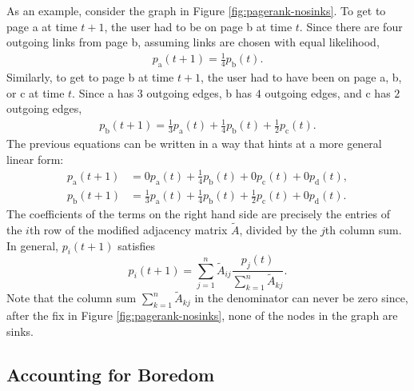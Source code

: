 As an example, consider the graph in Figure \ref{fig:pagerank-nosinks}.
To get to page a at time $t + 1$, the user had to be on page b at time $t$.
Since there are four outgoing links from page b, assuming links are chosen with equal likelihood,
\begin{align*}
p_\text{a}(t+1) = \frac{1}{4}p_\text{b}(t).
\end{align*}
Similarly, to get to page b at time $t+1$, the user had to have been on page a, b, or c at time $t$.
Since a has $3$ outgoing edges, b has $4$ outgoing edges, and c has $2$ outgoing edges,
\begin{align*}
p_\text{b}(t+1)
= \frac{1}{3}p_\text{a}(t)
+ \frac{1}{4}p_\text{b}(t)
+ \frac{1}{2}p_\text{c}(t).
\end{align*}
The previous equations can be written in a way that hints at a more general linear form:
\begin{align*}
p_\text{a}(t+1)
    &= 0p_\text{a}(t)
    + \frac{1}{4}p_\text{b}(t)
    + 0p_\text{c}(t)
    + 0p_\text{d}(t),
\\
p_\text{b}(t+1)
    &= \frac{1}{3}p_\text{a}(t)
    + \frac{1}{4}p_\text{b}(t)
    + \frac{1}{2}p_\text{c}(t)
    + 0p_\text{d}(t).
\end{align*}
The coefficients of the terms on the right hand side are precisely the entries of the $i$th row of the modified adjacency matrix $\widetilde{A}$, divided by the $j$th column sum.
In general, $p_i(t+1)$ satisfies
\begin{equation}\label{eq:pagerank-single-initial}
p_i(t+1) = \sum_{j=1}^{n} \widetilde{A}_{ij} \frac{p_j(t)}{\sum_{k=1}^n \widetilde{A}_{kj}}.
\end{equation}
Note that the column sum $\sum_{k=1}^n \widetilde{A}_{kj}$ in the denominator can never be zero since, after the fix in Figure \ref{fig:pagerank-nosinks}, none of the nodes in the graph are sinks.

\subsection*{Accounting for Boredom} %


